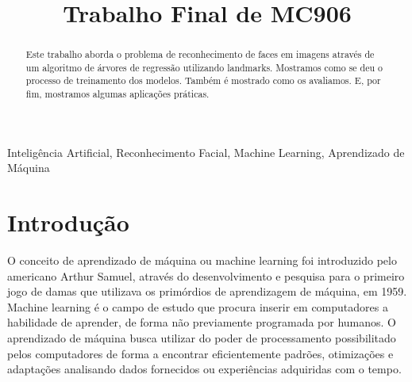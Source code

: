 \documentclass[twoside,conference,a4paper]{IEEEtran}
\begin{document}
\renewcommand{\IEEEkeywordsname}{Palavras-chave}


\title{Trabalho Final de MC906}
\author{%
}


\maketitle

\begin{abstract}
Este trabalho aborda o problema de reconhecimento de faces em imagens através de um algoritmo de árvores de regressão utilizando landmarks. Mostramos como se deu o processo de treinamento dos modelos. Também é mostrado como os avaliamos. E, por fim, mostramos algumas aplicações práticas.
\end{abstract}

\begin{IEEEkeywords}
 Inteligência Artificial, Reconhecimento Facial, Machine Learning, Aprendizado de Máquina
\end{IEEEkeywords}

\section{Introdução}
O conceito de aprendizado de máquina ou machine learning foi introduzido pelo americano Arthur Samuel, através do desenvolvimento e pesquisa para o primeiro jogo de damas que utilizava os primórdios de aprendizagem de máquina, em 1959. Machine learning é o campo de estudo que procura inserir em computadores a habilidade de aprender, de forma não previamente programada por humanos. O aprendizado de máquina busca utilizar do poder de processamento possibilitado pelos computadores de forma a encontrar eficientemente padrões, otimizações e adaptações analisando dados fornecidos ou experiências adquiridas com o tempo. 
\end{document}
